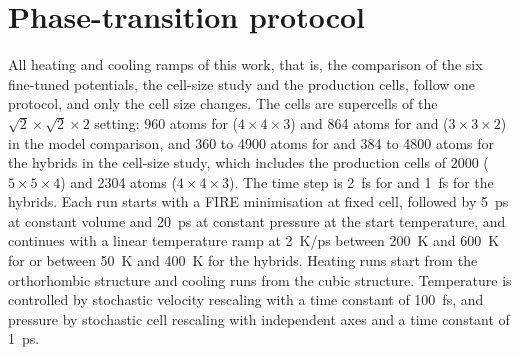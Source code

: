 

\section{Phase-transition protocol}
\label{si:models}
All heating and cooling ramps of this work, that is, the comparison of the six fine-tuned potentials,
the cell-size study and the production cells, follow one protocol, and only the cell size changes. The
cells are supercells of the $\sqrt2\times\sqrt2\times2$ setting: 960 atoms for \CsSnI{}
($4\times4\times3$) and 864 atoms for \MASnI{} and \FASnI{} ($3\times3\times2$) in the model
comparison, and 360 to 4900 atoms for \CsSnI{} and 384 to 4800 atoms for the hybrids in the cell-size
study, which includes the production cells of 2000 ($5\times5\times4$) and 2304 atoms
($4\times4\times3$). The time step is \SI{2}{fs} for \CsSnI{} and \SI{1}{fs} for the hybrids. Each
run starts with a FIRE minimisation at fixed cell, followed by \SI{5}{ps} at constant volume and
\SI{20}{ps} at constant pressure at the start temperature, and continues with a linear temperature
ramp at \SI{2}{K/ps} between \SI{200}{K} and \SI{600}{K} for \CsSnI{} or between \SI{50}{K} and
\SI{400}{K} for the hybrids. Heating runs start from the orthorhombic structure and cooling runs from
the cubic structure.  Temperature is controlled by stochastic velocity rescaling with a time constant
of \SI{100}{fs}, and pressure by stochastic cell rescaling with independent axes and a time constant
of \SI{1}{ps}.

